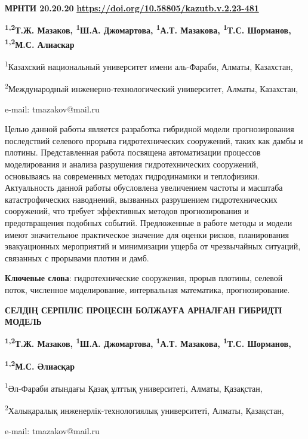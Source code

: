 \newpage
{\bfseries МРНТИ 20.20.20}
\hfill {\bfseries \href{https://doi.org/10.58805/kazutb.v.2.23-481}{https://doi.org/10.58805/kazutb.v.2.23-481}}


\begin{center}
{\bfseries \textsuperscript{1,2}Т.Ж. Мазаков\envelope, \textsuperscript{1}Ш.А.
Джомартова, \textsuperscript{1}А.Т. Мазакова, \textsuperscript{1}Т.С.
Шорманов, \textsuperscript{1,2}М.С. Алиаскар}

\textsuperscript{1}Казахский национальный университет имени аль-Фараби,
Алматы, Казахстан,

\textsuperscript{2}Международный инженерно-технологический университет,
Алматы, Казахстан,

e-mail: tmazakov@mail.ru
\end{center}

Целью данной работы является разработка гибридной модели прогнозирования
последствий селевого прорыва гидротехнических сооружений, таких как
дамбы и плотины. Представленная работа посвящена автоматизации процессов
моделирования и анализа разрушения гидротехнических сооружений,
основываясь на современных методах гидродинамики и теплофизики.
Актуальность данной работы обусловлена увеличением частоты и масштаба
катастрофических наводнений, вызванных разрушением гидротехнических
сооружений, что требует эффективных методов прогнозирования и
предотвращения подобных событий. Предложенные в работе методы и модели
имеют значительное практическое значение для оценки рисков, планирования
эвакуационных мероприятий и минимизации ущерба от чрезвычайных ситуаций,
связанных с прорывами плотин и дамб.

{\bfseries Ключевые слова}: гидротехнические сооружения, прорыв плотины,
селевой поток, численное моделирование, интервальная математика,
прогнозирование.

\begin{center}
{\large\bfseries СЕЛДІҢ СЕРПІЛІС ПРОЦЕСІН БОЛЖАУҒА АРНАЛҒАН ГИБРИДТІ МОДЕЛЬ}

{\bfseries \textsuperscript{1,2}Т.Ж. Мазаков\envelope, \textsuperscript{1}Ш.А.
Джомартова, \textsuperscript{1}А.Т. Мазакова, \textsuperscript{1}Т.С.
Шорманов,}

{\bfseries \textsuperscript{1,2}М.С. Әлиасқар}

\textsuperscript{1}Әл-Фараби атындағы Қазақ ұлттық университеті, Алматы,
Қазақстан,

\textsuperscript{2}Халықаралық инженерлік-технологиялық университеті,
Алматы, Қазақстан,

e-mail: tmazakov@mail.ru
\end{center}

